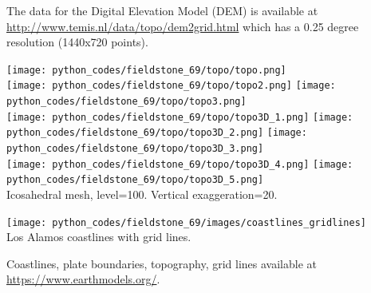 The data for the Digital Elevation Model (DEM) 
is available at \url{http://www.temis.nl/data/topo/dem2grid.html}
which has a 0.25 degree resolution (1440x720 points).

\begin{center}
\texttt{[image: python\_codes/fieldstone\_69/topo/topo.png]}\\
\texttt{[image: python\_codes/fieldstone\_69/topo/topo2.png]}
\texttt{[image: python\_codes/fieldstone\_69/topo/topo3.png]}\\
\texttt{[image: python\_codes/fieldstone\_69/topo/topo3D\_1.png]}
\texttt{[image: python\_codes/fieldstone\_69/topo/topo3D\_2.png]}
\texttt{[image: python\_codes/fieldstone\_69/topo/topo3D\_3.png]}\\
\texttt{[image: python\_codes/fieldstone\_69/topo/topo3D\_4.png]}
\texttt{[image: python\_codes/fieldstone\_69/topo/topo3D\_5.png]}\\
{\captionfont Icosahedral mesh, level=100. Vertical exaggeration=20.}
\end{center}


\begin{center}
\texttt{[image: python\_codes/fieldstone\_69/images/coastlines\_gridlines]}\\
{\captionfont Los Alamos coastlines with grid lines.}
\end{center}

Coastlines, plate boundaries, topography, grid lines available at \url{https://www.earthmodels.org/}.
